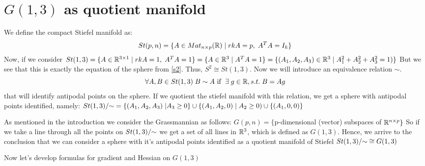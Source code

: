 \documentclass[11pt,a4paper]{report}
\begin{document}
\section{$G(1,3)$ as quotient manifold} 
We define the compact Stiefel manifold as:
$$ St(p,n) = \{ A \in Mat_{n \times p}(\mathbb{R}) \; | \; rkA = p, \; A^T A = I_k \}  $$
Now, if we consider $St(1,3) = \{ A \in \mathbb{R}^{3 \times 1} \; | \; rkA=1, \; A^T A = 1 \} = \{ A \in \mathbb{R}^3 \; | \; A^T A = 1 \} = 
\{ (A_1, A_2, A_3) \in \mathbb{R}^3 \; | \; A_1^2 + A_2^2 + A_3^2 = 1) \} $ 
But we see that this is exactly the equation of the sphere from \ref{s2}. Thus, $S^2 \cong St(1,3)$.
Now we will introduce an equivalence relation $ \sim $.
$$ \forall A,B \in St(1,3) \; B \sim A \text{ if } \; \exists \; g \in \mathbb{R}, s.t. \; B = A g $$
that will identify antipodal points on the sphere.
If we quotient the stiefel manifold with this relation, we get a sphere with antipodal points identified, namely: 
$ St(1,3)/{\sim} = \{ (A_1, A_2, A_3) \; | A_3 \geq 0 \} \cup \{ (A_1, A_2, 0) \; | \; A_2 \geq 0) \cup \{ (A_1, 0, 0) \}  $

As mentioned in the introduction we consider the Grassmannian as follows:
$G(p,n) = \{ $p-dimensional (vector) subspaces of $\mathbb{R}^{n \times p} \}$
So if we take a line through all the points on $St(1,3)/{\sim}$ we get a set of all lines in $\mathbb{R}^3$, which is defined as $G(1,3)$. 
Hence, we arrive to the conclusion that we can consider a sphere with it's antipodal points identified as a quotient manifold of Stiefel $St(1,3)/{\sim} \cong G(1,3)$
\newline

Now let's develop formulas for gradient and Hessian on $G(1,3)$
\end{document}
